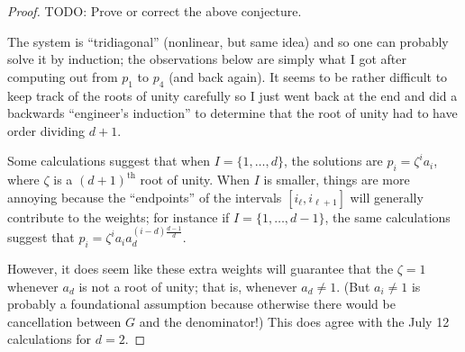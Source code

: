 \documentclass[A4,12pt]{article}
\newcommand{\<}{\left\langle}
\renewcommand{\>}{\right\rangle}
\theoremstyle{definition}
\theoremstyle{example}
\begin{document}
\begin{proof}
TODO: Prove or correct the above conjecture.

The system is ``tridiagonal'' (nonlinear, but same idea) and so one can probably solve it by induction; the observations below are simply what I got after computing out from $p_1$ to $p_4$ (and back again). It seems to be rather difficult to keep track of the roots of unity carefully so I just went back at the end and did a backwards ``engineer's induction'' to determine that the root of unity had to have order dividing $d+1$.

Some calculations suggest that when $I=\{1,\dots,d\}$, the solutions are $p_i=\zeta^i a_i$, where $\zeta$ is a $(d+1)^\text{th}$ root of unity. When $I$ is smaller, things are more annoying because the ``endpoints'' of the intervals $[i_\ell,i_{\ell+1}]$ will generally contribute to the weights; for instance if $I=\{1,\dots, d-1\}$, the same calculations suggest that $p_i=\zeta^i a_i a_d^{(i-d)\frac{d-1}{d}}$. 

However, it does seem like these extra weights will guarantee that the $\zeta=1$ whenever $a_d$ is not a root of unity; that is, whenever $a_d\neq 1$. (But $a_i\neq 1$ is probably a foundational assumption because otherwise there would be cancellation between $G$ and the denominator!) This does agree with the July 12 calculations for $d=2$.
\end{proof}




\newpage
\footnotesize
\begin{thebibliography}{10}



%

\end{thebibliography}
\end{document}
